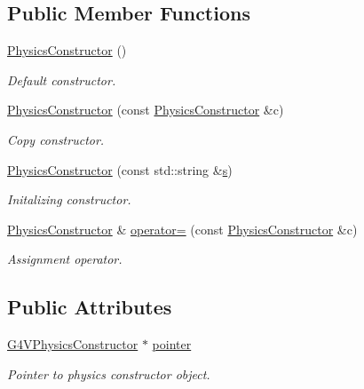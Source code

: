 \subsection*{Public Member Functions}
\begin{DoxyCompactItemize}
\item 
\hyperlink{class_d_d4hep_1_1_simulation_1_1_geant4_physics_list_1_1_physics_constructor_a3c66a1cc69a9c2b3d8a4c2febcd17ceb}{Physics\+Constructor} ()
\begin{DoxyCompactList}\small\item\em Default constructor. \end{DoxyCompactList}\item 
\hyperlink{class_d_d4hep_1_1_simulation_1_1_geant4_physics_list_1_1_physics_constructor_a6dd26f324ed74b412c93e8d555939c68}{Physics\+Constructor} (const \hyperlink{class_d_d4hep_1_1_simulation_1_1_geant4_physics_list_1_1_physics_constructor}{Physics\+Constructor} \&c)
\begin{DoxyCompactList}\small\item\em Copy constructor. \end{DoxyCompactList}\item 
\hyperlink{class_d_d4hep_1_1_simulation_1_1_geant4_physics_list_1_1_physics_constructor_a38411ded2599196e9a79aa2abb72cc66}{Physics\+Constructor} (const std\+::string \&\hyperlink{_volumes_8cpp_a17ca6bfc8040d695d3cada22a4763d40}{s})
\begin{DoxyCompactList}\small\item\em Initalizing constructor. \end{DoxyCompactList}\item 
\hyperlink{class_d_d4hep_1_1_simulation_1_1_geant4_physics_list_1_1_physics_constructor}{Physics\+Constructor} \& \hyperlink{class_d_d4hep_1_1_simulation_1_1_geant4_physics_list_1_1_physics_constructor_a05c1b02c48b71ab46e1cbe56f059f9b7}{operator=} (const \hyperlink{class_d_d4hep_1_1_simulation_1_1_geant4_physics_list_1_1_physics_constructor}{Physics\+Constructor} \&c)
\begin{DoxyCompactList}\small\item\em Assignment operator. \end{DoxyCompactList}\end{DoxyCompactItemize}
\subsection*{Public Attributes}
\begin{DoxyCompactItemize}
\item 
\hyperlink{class_g4_v_physics_constructor}{G4\+V\+Physics\+Constructor} $\ast$ \hyperlink{class_d_d4hep_1_1_simulation_1_1_geant4_physics_list_1_1_physics_constructor_a30d7b232e1e35f1eb610c375a9e9e774}{pointer}
\begin{DoxyCompactList}\small\item\em Pointer to physics constructor object. \end{DoxyCompactList}\end{DoxyCompactItemize}


